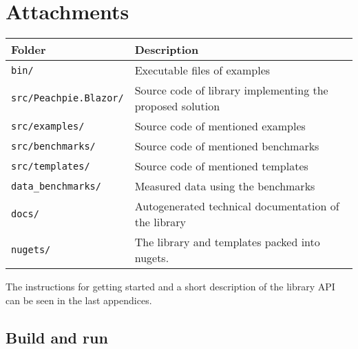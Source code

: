 \chapter{Attachments}

\begin{table}[H]
\centering
\begin{tabular}{ | m{11em} | m{22em}| } 
\hline
Folder & Description \\
\hline
\texttt{bin/} & Executable files of examples \\
\texttt{src/Peachpie.Blazor/} & Source code of library implementing the proposed solution \\
\texttt{src/examples/} & Source code of mentioned examples \\
\texttt{src/benchmarks/} & Source code of mentioned benchmarks \\
\texttt{src/templates/} & Source code of mentioned templates \\
\texttt{data\_benchmarks/} & Measured data using the benchmarks \\
\texttt{docs/} & Autogenerated technical documentation of the library\\
\texttt{nugets/} & The library and templates packed into nugets. \\
\hline
\end{tabular}
\end{table}

The instructions for getting started and a short description of the library API can be seen in the last appendices.

\section{Build and run}

